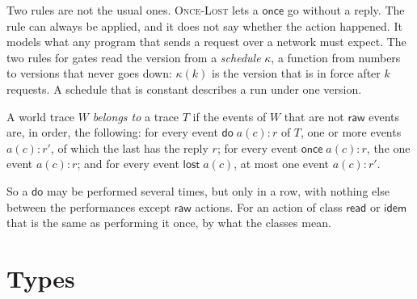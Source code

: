 \documentclass[acmsmall,nonacm,screen]{acmart}
\newcommand{\kw}[1]{\mathsf{#1}}
\newcommand{\rd}{\kw{read}}
\newcommand{\idem}{\kw{idem}}
\begin{document}
Two rules are not the usual ones. \textsc{Once-Lost} lets a $\kw{once}$ go without a reply.
The rule can always be applied, and it does not say whether the action happened. It models
what any program that sends a request over a network must expect. The two rules for gates
read the version from a \emph{schedule} $\kappa$, a function from numbers to versions that
never goes down: $\kappa(k)$ is the version that is in force after $k$ requests. A schedule
that is constant describes a run under one version.

\begin{definition}
\label{def:trace}
A world trace $W$ \emph{belongs to} a trace $T$ if the events of $W$ that are not $\kw{raw}$
events are, in order, the following: for every event $\kw{do}\;a(c){:}r$ of $T$, one or more
events $a(c){:}r'$, of which the last has the reply $r$; for every event
$\kw{once}\;a(c){:}r$, the one event $a(c){:}r$; and for every event $\kw{lost}\;a(c)$, at
most one event $a(c){:}r'$.
\end{definition}

So a $\kw{do}$ may be performed several times, but only in a row, with nothing else between
the performances except $\kw{raw}$ actions. For an action of class $\rd$ or $\idem$ that is
the same as performing it once, by what the classes mean.

\section{Types}
\label{sec:types}
\end{document}
